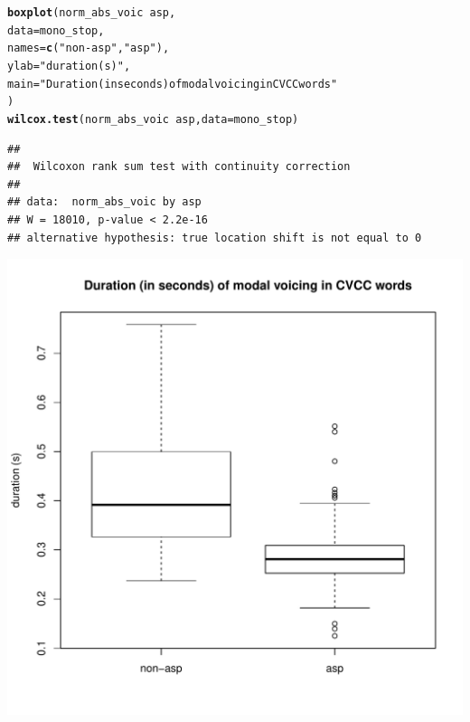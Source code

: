 \documentclass[a4paper,11pt]{article}\usepackage[]{graphicx}\usepackage[]{color}
\makeatletter
\def\maxwidth{ %
  \ifdim\Gin@nat@width>\linewidth
    \linewidth
  \else
    \Gin@nat@width
  \fi
}
\newcommand{\hlstr}[1]{\textcolor[rgb]{0.192,0.494,0.8}{#1}}%
\newcommand{\hlopt}[1]{\textcolor[rgb]{0,0,0}{#1}}%
\newcommand{\hlstd}[1]{\textcolor[rgb]{0.345,0.345,0.345}{#1}}%
\newcommand{\hlkwc}[1]{\textcolor[rgb]{0.333,0.667,0.333}{#1}}%
\newcommand{\hlkwd}[1]{\textcolor[rgb]{0.737,0.353,0.396}{\textbf{#1}}}%
\newenvironment{kframe}{%
 \def\at@end@of@kframe{}%
 \ifinner\ifhmode%
  \def\at@end@of@kframe{\end{minipage}}%
  \begin{minipage}{\columnwidth}%
 \fi\fi%
 \def\FrameCommand##1{\hskip\@totalleftmargin \hskip-\fboxsep
 \colorbox{shadecolor}{##1}\hskip-\fboxsep
     \hskip-\linewidth \hskip-\@totalleftmargin \hskip\columnwidth}%
 \MakeFramed {\advance\hsize-\width
   \@totalleftmargin\z@ \linewidth\hsize
   \@setminipage}}%
 {\par\unskip\endMakeFramed%
 \at@end@of@kframe}
\newenvironment{knitrout}{}{} %
\makeatother
\begin{document}
\begin{knitrout}
\color{fgcolor}\begin{kframe}
\begin{alltt}
\hlkwd{boxplot}\hlstd{(norm_abs_voic} \hlopt{~} \hlstd{asp,}
        \hlkwc{data} \hlstd{= mono_stop,}
        \hlkwc{names} \hlstd{=} \hlkwd{c}\hlstd{(}\hlstr{"non-asp"}\hlstd{,} \hlstr{"asp"}\hlstd{),}
        \hlkwc{ylab} \hlstd{=} \hlstr{"duration (s)"}\hlstd{,}
        \hlkwc{main} \hlstd{=} \hlstr{"Duration (in seconds) of modal voicing in CVCC words"}
        \hlstd{)}
\hlkwd{wilcox.test}\hlstd{(norm_abs_voic} \hlopt{~} \hlstd{asp,} \hlkwc{data} \hlstd{= mono_stop)}
\end{alltt}
\begin{verbatim}
## 
## 	Wilcoxon rank sum test with continuity correction
## 
## data:  norm_abs_voic by asp
## W = 18010, p-value < 2.2e-16
## alternative hypothesis: true location shift is not equal to 0
\end{verbatim}
\end{kframe}

{\centering \includegraphics[width=\maxwidth]{img/mono-stop-box-1} 

}



\end{knitrout}
\end{document}
